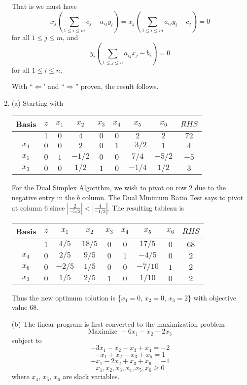 \documentclass{article}[12pt,a4paper]
\begin{document}
\begin{enumerate}
  That is we must have
  $$x_j(\sum_{1 \le i \le m}{c_j - a_{ij}y_i}) = x_j(\sum_{1 \le i \le m}{a_{ij}y_i - c_j}) = 0$$
  for all $1 \le j \le m$, and
  $$y_i(\sum_{1 \le j \le n}{a_{ij}x_j - b_i}) = 0$$ 
  for all $1 \le i \le n$. \newline
  
  With ``$\mathbf{\Leftarrow}$' and  ``$\mathbf{\Rightarrow}$'' proven, the result follows.
  
  \pagebreak
  
  \item
  (a) Starting with 
   \begin{center}
  \begin{tabular}{c | c | c c c c c c | c}
  Basis & $z$ & $x_1$ & $x_2$ & $x_3$ & $x_4$ & $x_5$ & $x_6$ & $RHS$ \\ \hline
           & $1$ & $0$ & $4$ & $0$ & $0$ & $2$ & $2$ & $72$ \\ \hline
  $x_4$ & $0$ & $0$ & $2$ & $0$ & $1$ & $-3/2$ & $1$ & $4$ \\
  $x_1$ & $0$ & $1$ & $-1/2$ & $0$ & $0$ & $7/4$ & $-5/2$ & $-5$ \\
  $x_3$ & $0$ & $0$ & $1/2$ & $1$ & $0$ & $-1/4$ & $1/2$ & $3$
  \end{tabular}
  \end{center}
  For the Dual Simplex Algorithm, we wish to pivot on row $2$ due to the negative entry in the $b$ column. 
  The Dual Minimum Ratio Test says to pivot at column $6$ since $|\frac{2}{-5/2}| < |\frac{4}{-1/2}|$. \newline 
  The resulting tableau is
  \begin{center}
  \begin{tabular}{c | c | c c c c c c | c}
  Basis & $z$ & $x_1$ & $x_2$ & $x_3$ & $x_4$ & $x_5$ & $x_6$ & $RHS$ \\ \hline
           & $1$ & $4/5$ & $18/5$ & $0$ & $0$ & $17/5$ & $0$ & $68$ \\ \hline
  $x_4$ & $0$ & $2/5$ & $9/5$ & $0$ & $1$ & $-4/5$ & $0$ & $2$ \\
  $x_6$ & $0$ & $-2/5$ & $1/5$ & $0$ & $0$ & $-7/10$ & $1$ & $2$ \\
  $x_3$ & $0$ & $1/5$ & $2/5$ & $1$ & $0$ & $1/10$ & $0$ & $2$
  \end{tabular}
  \end{center}
  Thus the new optimum solution is \{$x_1 = 0$, $x_2 = 0$, $x_3 = 2$\} with objective value $68$. \newline
  
  (b)
  The linear program is first converted to the maximization problem
   $$\mbox{Maximize } -6x_1 - x_2 - 2x_3$$
  subject to
  $$-3x_1 - x_2 - x_3 + x_4 = -2$$
  $$-x_1 + x_2 - x_3 + x_5 = 1$$
  $$-x_1 - 2x_2 + x_3 + x_6 = -1$$
  $$x_1, x_2, x_3, x_4, x_5, x_6 \ge 0$$
  where $x_4$, $x_5$, $x_6$ are slack variables. \newline
  

\end{enumerate}
\end{document}
